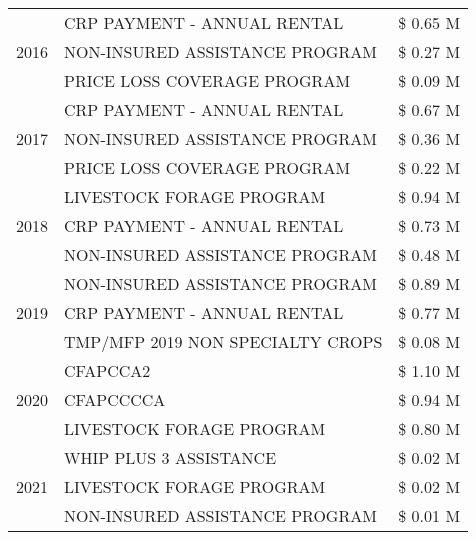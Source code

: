 \begin{tabular}{llr}
\cline{1-3}
\multirow[t]{3}{*}{2016} & CRP PAYMENT - ANNUAL RENTAL                   & \$ 0.65 M \\
 & NON-INSURED ASSISTANCE PROGRAM                & \$ 0.27 M \\
 & PRICE LOSS COVERAGE PROGRAM                   & \$ 0.09 M \\
\cline{1-3}
\multirow[t]{3}{*}{2017} & CRP PAYMENT - ANNUAL RENTAL & \$ 0.67 M \\
 & NON-INSURED ASSISTANCE PROGRAM & \$ 0.36 M \\
 & PRICE LOSS COVERAGE PROGRAM & \$ 0.22 M \\
\cline{1-3}
\multirow[t]{3}{*}{2018} & LIVESTOCK FORAGE PROGRAM & \$ 0.94 M \\
 & CRP PAYMENT - ANNUAL RENTAL & \$ 0.73 M \\
 & NON-INSURED ASSISTANCE PROGRAM & \$ 0.48 M \\
\cline{1-3}
\multirow[t]{3}{*}{2019} & NON-INSURED ASSISTANCE PROGRAM & \$ 0.89 M \\
 & CRP PAYMENT - ANNUAL RENTAL & \$ 0.77 M \\
 & TMP/MFP 2019 NON SPECIALTY CROPS & \$ 0.08 M \\
\cline{1-3}
\multirow[t]{3}{*}{2020} & CFAPCCA2 & \$ 1.10 M \\
 & CFAPCCCCA & \$ 0.94 M \\
 & LIVESTOCK FORAGE PROGRAM & \$ 0.80 M \\
\cline{1-3}
\multirow[t]{3}{*}{2021} & WHIP PLUS 3 ASSISTANCE & \$ 0.02 M \\
 & LIVESTOCK FORAGE PROGRAM & \$ 0.02 M \\
 & NON-INSURED ASSISTANCE PROGRAM & \$ 0.01 M \\
\cline{1-3}
\bottomrule
\end{tabular}
